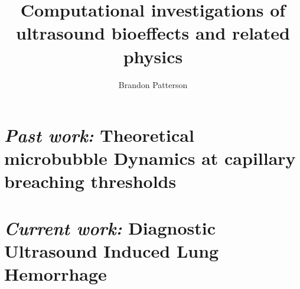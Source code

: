 \documentclass{./tex/thesis-umich}
\title{Computational investigations of ultrasound bioeffects and related physics}
\author{Brandon Patterson}
\begin{document}
% 


% 



\chapter{\textit{Past work:} Theoretical microbubble Dynamics at capillary breaching thresholds}   \label{ch:usbe_bubble}%
%

% 
\acresetall
%
\chapter{\textit{Current work:} Diagnostic Ultrasound Induced Lung Hemorrhage} \label{ch:usbe_lung}




%




%
\acresetall


\acresetall
\end{document}

